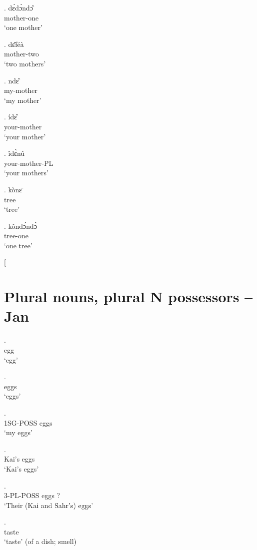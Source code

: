 \documentclass{assets/fieldnotes}
\begin{document}
 \exg. dɛ́dɔ́ndɔ̂\\
  mother-one\\
`one mother'

 \exg. dɛ̂féà\\
  mother-two\\
`two mothers'

 \exg. ndɛ̂\\
  my-mother\\
`my mother'

 \exg. ídɛ̂\\
  your-mother\\
`your mother'

 \exg. îdɛ̀nû\\
  your-mother-PL\\
`your mothers'



\exg. kònɛ̄\\
tree\\
`tree'

\exg. kôndɔ́ndɔ̀\\
  tree-one\\
`one tree'



[\section{Plural nouns, plural N possessors -- Jan} 

\exg.  \\
egg\\
`egg' 

\exg.  \\
eggs\\
`eggs' 

\exg.  \\
1SG-POSS eggs\\
`my eggs' 

\exg.  \\
Kai's eggs\\
`Kai's eggs' 

\exg.  \\
3-PL-POSS eggs ?\\
`Their (Kai and Sahr's) eggs' 


\exg.  \\
taste\\
`taste' (of a dish; smell) 
\end{document}
